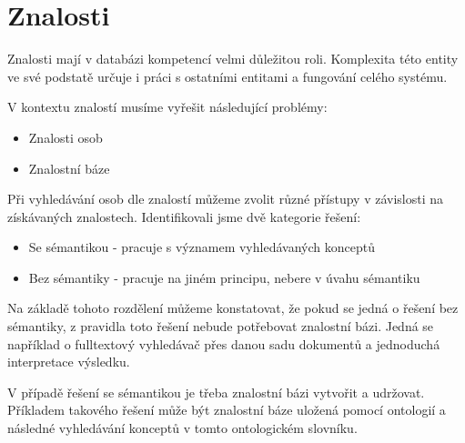 \section{Znalosti} %
Znalosti mají v databázi kompetencí velmi důležitou roli. Komplexita této entity ve své podstatě určuje i práci s ostatními entitami a fungování celého systému.\par
\noindent V kontextu znalostí musíme vyřešit následující problémy:
\begin{itemize}
    \item Znalosti osob
    \item Znalostní báze
\end{itemize}
Při vyhledávání osob dle znalostí můžeme zvolit různé přístupy v závislosti na získávaných znalostech. Identifikovali jsme dvě kategorie řešení:
\begin{itemize}
    \item Se sémantikou - pracuje s významem vyhledávaných konceptů
    \item Bez sémantiky - pracuje na jiném principu, nebere v úvahu sémantiku
\end{itemize}
Na základě tohoto rozdělení můžeme konstatovat, že pokud se jedná o řešení bez sémantiky, z pravidla toto řešení nebude potřebovat znalostní bázi. Jedná se například o fulltextový vyhledávač přes danou sadu dokumentů a jednoduchá interpretace výsledku.\par
V případě řešení se sémantikou je třeba znalostní bázi vytvořit a udržovat. Příkladem takového řešení může být znalostní báze uložená pomocí ontologií a následné vyhledávání konceptů v tomto ontologickém slovníku.\par
